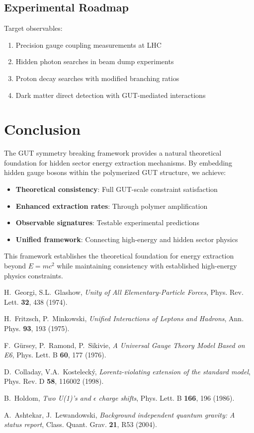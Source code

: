 \documentclass[11pt]{article}
\begin{document}
\subsection{Experimental Roadmap}

Target observables:
\begin{enumerate}
    \item Precision gauge coupling measurements at LHC
    \item Hidden photon searches in beam dump experiments
    \item Proton decay searches with modified branching ratios
    \item Dark matter direct detection with GUT-mediated interactions
\end{enumerate}

\section{Conclusion}

The GUT symmetry breaking framework provides a natural theoretical foundation for hidden sector energy extraction mechanisms. By embedding hidden gauge bosons within the polymerized GUT structure, we achieve:

\begin{itemize}
    \item \textbf{Theoretical consistency}: Full GUT-scale constraint satisfaction
    \item \textbf{Enhanced extraction rates}: Through polymer amplification
    \item \textbf{Observable signatures}: Testable experimental predictions
    \item \textbf{Unified framework}: Connecting high-energy and hidden sector physics
\end{itemize}

This framework establishes the theoretical foundation for energy extraction beyond $E=mc^2$ while maintaining consistency with established high-energy physics constraints.

\begin{thebibliography}{9}

 H.~Georgi, S.L.~Glashow, \textit{Unity of All Elementary-Particle Forces}, Phys. Rev. Lett. \textbf{32}, 438 (1974).

 H.~Fritzsch, P.~Minkowski, \textit{Unified Interactions of Leptons and Hadrons}, Ann. Phys. \textbf{93}, 193 (1975).

 F.~Gürsey, P.~Ramond, P.~Sikivie, \textit{A Universal Gauge Theory Model Based on E6}, Phys. Lett. B \textbf{60}, 177 (1976).

 D.~Colladay, V.A.~Kostelecký, \textit{Lorentz-violating extension of the standard model}, Phys. Rev. D \textbf{58}, 116002 (1998).

 B.~Holdom, \textit{Two U(1)'s and $\epsilon$ charge shifts}, Phys. Lett. B \textbf{166}, 196 (1986).

 A.~Ashtekar, J.~Lewandowski, \textit{Background independent quantum gravity: A status report}, Class. Quant. Grav. \textbf{21}, R53 (2004).

\end{thebibliography}
\end{document}
